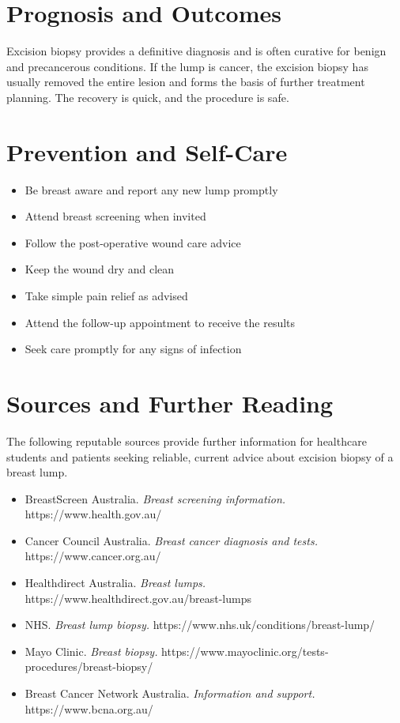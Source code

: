 \section*{Prognosis and Outcomes}
Excision biopsy provides a definitive diagnosis and is often curative for benign and precancerous conditions. If the lump is cancer, the excision biopsy has usually removed the entire lesion and forms the basis of further treatment planning. The recovery is quick, and the procedure is safe.

\section*{Prevention and Self-Care}
\begin{itemize}
    \item Be breast aware and report any new lump promptly
    \item Attend breast screening when invited
    \item Follow the post-operative wound care advice
    \item Keep the wound dry and clean
    \item Take simple pain relief as advised
    \item Attend the follow-up appointment to receive the results
    \item Seek care promptly for any signs of infection
\end{itemize}

\section*{Sources and Further Reading}
The following reputable sources provide further information for healthcare students and patients seeking reliable, current advice about excision biopsy of a breast lump.
\begin{itemize}
    \item BreastScreen Australia. \textit{Breast screening information.} https://www.health.gov.au/
    \item Cancer Council Australia. \textit{Breast cancer diagnosis and tests.} https://www.cancer.org.au/
    \item Healthdirect Australia. \textit{Breast lumps.} https://www.healthdirect.gov.au/breast-lumps
    \item NHS. \textit{Breast lump biopsy.} https://www.nhs.uk/conditions/breast-lump/
    \item Mayo Clinic. \textit{Breast biopsy.} https://www.mayoclinic.org/tests-procedures/breast-biopsy/
    \item Breast Cancer Network Australia. \textit{Information and support.} https://www.bcna.org.au/
\end{itemize}
